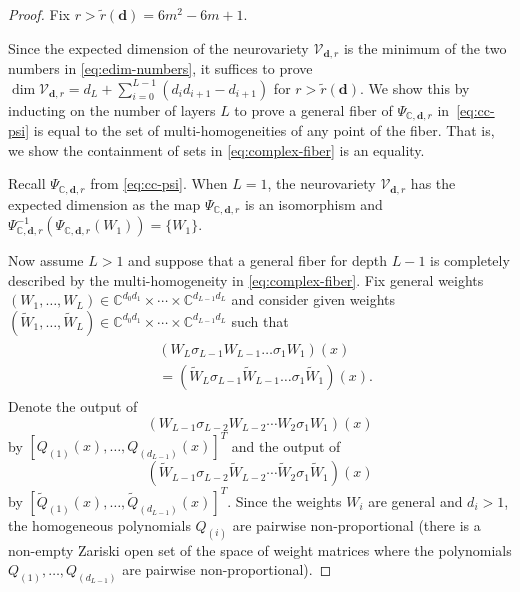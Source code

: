 \documentclass[12pt]{article}
\theoremstyle{definition}
\newcommand{\bfd}{\mathbf{d}}
\newcommand{\upperboundn}[1]{6{#1}^2-6#1+1}
\newcommand{\edimLHS}{d_L+\sum_{i=0}^{L-1}(d_id_{i+1}-d_{i+1})}
\newcommand{\pw}[1]{p_{\mathbf{w}_{#1}}}
\newcommand{\tildepw}[1]{\tilde{p}_{\mathbf{w}_{#1}}}
\renewcommand{\pw}[1]{Q_{({#1})}}
\renewcommand{\tildepw}[1]{\tilde{Q}_{({#1})}}
\newcommand{\complexPsiMap}{\Psi_{{\mathbb{C},\mathbf{d},r}}}
\renewcommand{\dim}[1]{\operatorname{dim}{#1}}
\begin{document}
\begin{proof}
Fix $r> \tilde{r}(\mathbf{d}) =  
\upperboundn{m}$.

Since the expected dimension of the neurovariety $\mathcal{V}_{\bfd,r}$ is the minimum of the two numbers in \eqref{eq:edim-numbers}, it suffices to prove $\dim{\mathcal{V}_{\bfd,r}}=\edimLHS$ for $r>\tilde{r}(\bfd)$.
{We show this 
by inducting} on the number of layers $L$ 
to prove a general fiber of
$\complexPsiMap$ in~\eqref{eq:cc-psi}
is equal to the set of multi-homogeneities of any point of the fiber. That is, we show the containment of sets in \eqref{eq:complex-fiber} is an equality.

Recall $\complexPsiMap$ from \eqref{eq:cc-psi}.
When $L=1$, the neurovariety $\mathcal{V}_{\mathbf{d},r}$ has the expected dimension as the map
$\complexPsiMap$
is an isomorphism 
and~$\complexPsiMap^{-1}(\complexPsiMap(W_1))=\{W_1\}$.

Now assume $L>1$ 
and suppose that  {a general} fiber for depth $L-1$ is completely described by the multi-homogeneity in \eqref{eq:complex-fiber}. 
 Fix general weights $(W_1,\dots,W_L)\in \mathbb{C}^{d_0 d_1}\times\cdots \times \mathbb{C}^{d_{L-1} d_L}$
and consider given weights $(\tilde{W}_1,\dots,\tilde{W}_L)\in \mathbb{C}^{d_0 d_1}\times\cdots \times \mathbb{C}^{d_{L-1}d_L}$
such that
\begin{align}\label{eq:KTB13}
\begin{split}
    &(W_L\sigma_{L-1} W_{L-1}\dots\sigma_1 W_1)(x)\\ &=(\tilde{W}_L\sigma_{L-1}\tilde{W}_{L-1}\dots\sigma_1 \tilde{W}_1)(x).
\end{split}
\end{align}
Denote the output of $$(W_{L-1}\sigma_{L-2} W_{L-2}\dotsb W_2\sigma_1 W_1)(x)$$ by 
    $\left[\pw{1}(x),\dots,\pw{d_{L-1}}(x)\right]^T$
and the output of $$(\tilde{W}_{L-1}\sigma_{L-2}\tilde{W}_{L-2}\dotsb \tilde{W}_2\sigma_1 \tilde{W}_1)(x)$$ 
by 
    $\left[\tildepw{1}(x),\dots,\tildepw{d_{L-1}}(x)\right]^T$.
Since the weights $W_i$ are general and $d_i>1$, the homogeneous polynomials 
$\pw{i}$
are pairwise non-proportional 
(there is a non-empty Zariski open set of the space of weight matrices where the 
polynomials
$\pw{1},\dots,\pw{d_{L-1}}$
are pairwise non-proportional). 


\end{proof}
\end{document}
